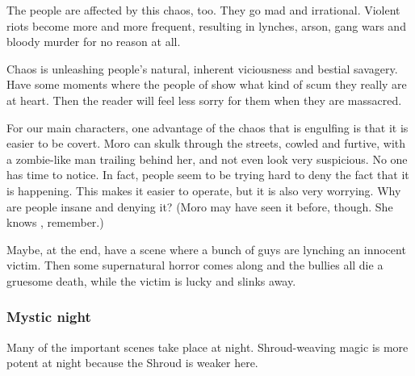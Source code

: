 The people are affected by this chaos, too. They go mad and irrational. Violent riots become more and more frequent, resulting in lynches, arson, gang wars and bloody murder for no reason at all. 

Chaos is unleashing people's natural, inherent viciousness and bestial savagery. 
Have some  moments where the people of \Malcur show what kind of scum they really are at heart. 
Then the reader will feel less sorry for them when they are massacred. 

For our main characters, one advantage of the chaos that is engulfing \Malcur is that it is easier to be covert. 
Moro \Cobrel can skulk through the streets, cowled and furtive, with a zombie-like man trailing behind her, and not even look very suspicious. 
No one has time to notice. 
In fact, people seem to be trying hard to deny the fact that it is happening. 
This makes it easier to operate, but it is also very worrying.
Why are people insane and denying it?
(Moro may have seen it before, though. She knows \Ubloth, remember.)

Maybe, at the end, have a scene where a bunch of guys are lynching an innocent victim. Then some supernatural horror comes along and the bullies all die a gruesome death, while the victim is lucky and slinks away. 






\subsubsection{Mystic night}
Many of the important scenes take place at night.
Shroud-weaving magic is more potent at night because the Shroud is weaker here. 

